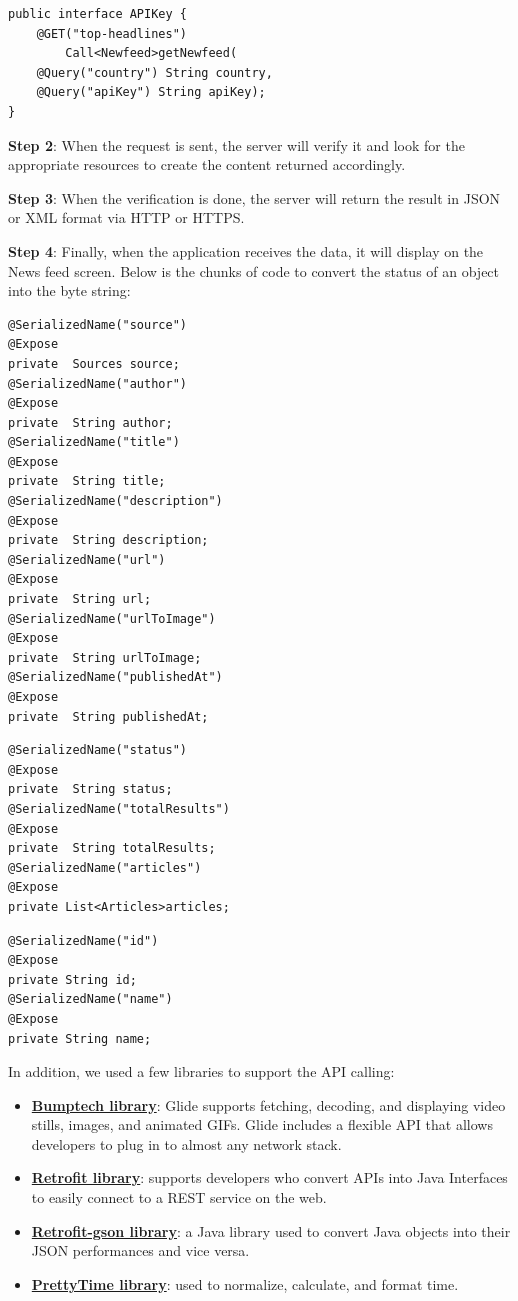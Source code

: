 \begin{verbatim}
public interface APIKey {
    @GET("top-headlines")
        Call<Newfeed>getNewfeed(
    @Query("country") String country,
    @Query("apiKey") String apiKey);
}
\end{verbatim}

\vspace{0.5cm}\textbf{Step 2}: When the request is sent, the server will verify it and look for the appropriate resources to create the content returned accordingly.

\vspace{0.5cm}\textbf{Step 3}: When the verification is done, the server will return the result in JSON or XML format via HTTP or HTTPS.

\vspace{0.5cm}\textbf{Step 4}: Finally, when the application receives the data, it will display on the News feed screen. Below is the chunks of code to convert the status of an object into the byte string:
\begin{verbatim}
@SerializedName("source")
@Expose
private  Sources source;
@SerializedName("author")
@Expose
private  String author;
@SerializedName("title")
@Expose
private  String title;
@SerializedName("description")
@Expose
private  String description;
@SerializedName("url")
@Expose
private  String url;
@SerializedName("urlToImage")
@Expose
private  String urlToImage;
@SerializedName("publishedAt")
@Expose
private  String publishedAt;
\end{verbatim}

\begin{verbatim}
@SerializedName("status")
@Expose
private  String status;
@SerializedName("totalResults")
@Expose
private  String totalResults;
@SerializedName("articles")
@Expose
private List<Articles>articles;
\end{verbatim}

\begin{verbatim}
@SerializedName("id")
@Expose
private String id;
@SerializedName("name")
@Expose
private String name;
\end{verbatim}

\vspace{0.5cm}In addition, we used a few libraries to support the API calling:
\begin{itemize}
    \item \underline{\textbf{Bumptech library}}: Glide supports fetching, decoding, and displaying video stills, images, and animated GIFs. Glide includes a flexible API that allows developers to plug in to almost any network stack.
    \item \underline{\textbf{Retrofit library}}: supports developers who convert APIs into Java Interfaces to easily connect to a REST service on the web.
    \item \underline{\textbf{Retrofit-gson library}}: a Java library used to convert Java objects into their JSON performances and vice versa.
    \item \underline{\textbf{PrettyTime library}}: used to normalize, calculate, and format time.
\end{itemize}


